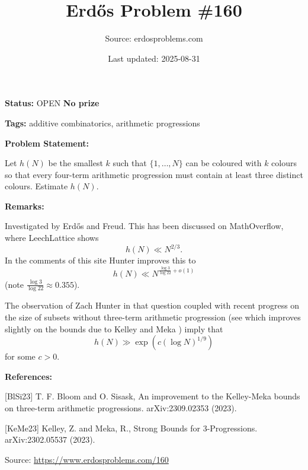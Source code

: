\documentclass{article}
\title{Erd\H{o}s Problem \#160}
\date{Last updated: 2025-08-31}
\author{Source: erdosproblems.com}
\begin{document}
\maketitle

\noindent\textbf{Status:} OPEN \quad \textbf{No prize}

\noindent\textbf{Tags:} additive combinatorics, arithmetic progressions

\medskip
\noindent\textbf{Problem Statement:}

Let $h(N)$ be the smallest $k$ such that $\{1,\ldots,N\}$ can be coloured with $k$ colours so that every four-term arithmetic progression must contain at least three distinct colours. Estimate $h(N)$.

\bigskip
\noindent\textbf{Remarks:}

Investigated by Erd\H{o}s and Freud. This has been discussed on MathOverflow, where LeechLattice shows\[h(N) \ll N^{2/3}.\]In the comments of this site Hunter improves this to\[h(N) \ll N^{\frac{\log 3}{\log 22}+o(1)}\](note $\frac{\log 3}{\log 22}\approx 0.355$).

The observation of Zach Hunter in that question coupled with recent progress on the size of subsets without three-term arithmetic progression (see \cite{BlSi23} which improves slightly on the bounds due to Kelley and Meka \cite{KeMe23}) imply that\[h(N) \gg \exp(c(\log N)^{1/9})\]for some $c>0$.

\bigskip
\noindent\textbf{References:}

[BlSi23] T. F. Bloom and O. Sisask, An improvement to the Kelley-Meka bounds on three-term arithmetic progressions. arXiv:2309.02353 (2023).
 
 [KeMe23] Kelley, Z. and Meka, R., Strong Bounds for 3-Progressions. arXiv:2302.05537 (2023).

\bigskip
\noindent\small{Source: \url{https://www.erdosproblems.com/160}}
\end{document}
